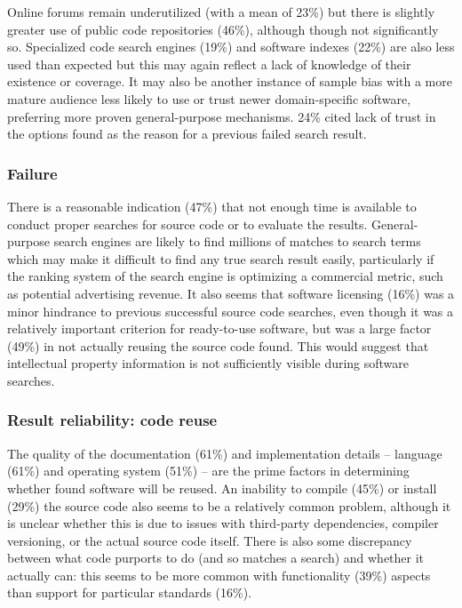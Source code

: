 \documentclass{casicswhitepaper}
\begin{document}
Online forums remain underutilized (with a mean of 23\%) but there is slightly greater use of public code repositories (46\%), although though not significantly so. Specialized code search engines (19\%) and software indexes (22\%) are also less used than expected but this may again reflect a lack of knowledge of their existence or coverage. It may also be another instance of sample bias with a more mature audience less likely to use or trust newer domain-specific software, preferring more proven general-purpose mechanisms.
24\% cited lack of trust in the options found as the reason for a previous failed search result.

\subsubsection{Failure}

There is a reasonable indication (47\%) that not enough time is available to conduct proper searches for source code or to evaluate the results. General-purpose search engines are likely to find millions of matches to search terms which may make it difficult to find any true search result easily, particularly if the ranking system of the search engine is optimizing a commercial metric, such as potential advertising revenue. It also seems that software licensing (16\%) was a minor hindrance to previous successful source code searches, even though it was a relatively important criterion for ready-to-use software, but was a large factor (49\%) in not actually reusing the source code found. This would suggest that intellectual property information is not sufficiently visible during software searches.

\subsubsection{Result reliability: code reuse}

The quality of the documentation (61\%) and implementation details -- language (61\%) and operating system (51\%) -- are the prime factors in determining whether found software will be reused. An inability to compile (45\%) or install (29\%) the source code also seems to be a relatively common problem, although it is unclear whether this is due to issues with third-party dependencies, compiler versioning, or the actual source code itself. There is also some discrepancy between what code purports to do (and so matches a search) and whether it actually can: this seems to be more common with functionality (39\%) aspects than support for particular standards (16\%). 
\end{document}
